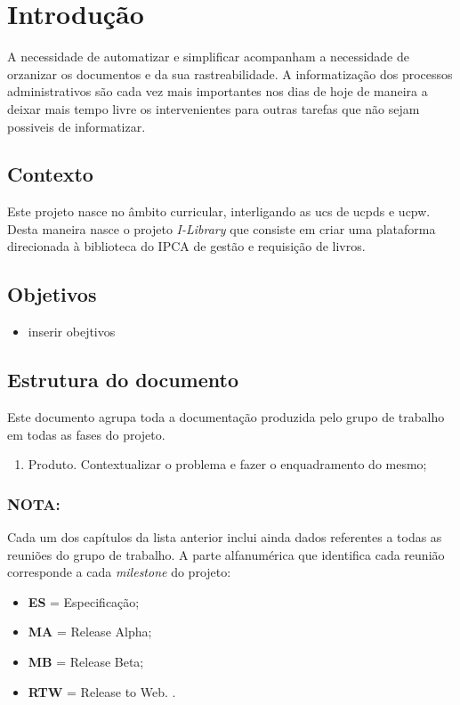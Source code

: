 
\chapter{Introdução}

A necessidade de automatizar e simplificar acompanham a necessidade de orzanizar os documentos e da sua rastreabilidade. A informatização dos processos administrativos são cada vez mais importantes nos dias de hoje de maneira a deixar mais tempo livre os intervenientes para outras tarefas que não sejam possiveis de informatizar. 

\section{Contexto}

Este projeto nasce no âmbito curricular, interligando as \acrshort{ucs} de \acrshort{ucpds} e \acrshort{ucpw}. Desta maneira nasce o projeto \textit{I-Library} que consiste em criar uma plataforma direcionada à biblioteca do IPCA de gestão e requisição de livros. 


\section{Objetivos}


\begin{itemize}
	\item inserir obejtivos

\end{itemize}

\clearpage

\section{Estrutura do documento}
Este documento agrupa toda a documentação produzida pelo grupo de trabalho em todas as fases do projeto.

\begin{enumerate}
	\item Produto. Contextualizar o problema e fazer o enquadramento do mesmo;

\end{enumerate}

\subsection*{\textbf{NOTA}:}

Cada um dos capítulos da lista anterior inclui ainda dados referentes a todas as reuniões do grupo de trabalho. A parte alfanumérica que identifica cada reunião corresponde a cada \textit{milestone} do projeto:
\begin{itemize}
	\item \textbf{ES} = Especificação;
	\item \textbf{MA} = Release Alpha;
	\item \textbf{MB} = Release Beta;
	\item \textbf{RTW} = Release to Web. . 
\end{itemize}

